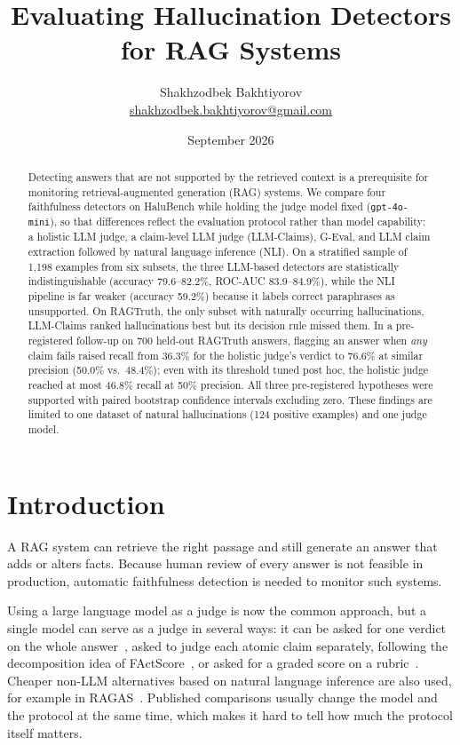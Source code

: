 \documentclass[11pt,a4paper]{article}
\title{\textbf{Evaluating Hallucination Detectors for RAG Systems}}
\author{Shakhzodbek Bakhtiyorov\\\small\href{mailto:shakhzodbek.bakhtiyorov@gmail.com}{shakhzodbek.bakhtiyorov@gmail.com}}
\date{September 2026}
\newcommand{\code}[1]{\texttt{\small #1}}
\begin{document}
\maketitle

\begin{abstract}
\noindent
Detecting answers that are not supported by the retrieved context is a prerequisite
for monitoring retrieval-augmented generation (RAG) systems. We compare four
faithfulness detectors on HaluBench while holding the judge model fixed
(\code{gpt-4o-mini}), so that differences reflect the evaluation protocol rather than
model capability: a holistic LLM judge, a claim-level LLM judge (LLM-Claims), G-Eval,
and LLM claim extraction followed by natural language inference (NLI). On a stratified
sample of 1{,}198 examples from six subsets, the three
LLM-based detectors are statistically indistinguishable (accuracy 79.6--82.2\%,
ROC-AUC 83.9--84.9\%), while the NLI pipeline is far weaker (accuracy 59.2\%) because
it labels correct paraphrases as unsupported. On RAGTruth, the only subset with
naturally occurring hallucinations, LLM-Claims ranked hallucinations best but its
decision rule missed them. In a pre-registered follow-up on 700 held-out RAGTruth
answers, flagging an answer when \emph{any} claim fails raised recall from 36.3\% for
the holistic judge's verdict to 76.6\% at similar precision (50.0\% vs.\ 48.4\%); even
with its threshold tuned post hoc, the holistic judge reached at most 46.8\% recall at
50\% precision. All three pre-registered hypotheses were supported with paired bootstrap
confidence intervals excluding zero. These findings are limited to one dataset of
natural hallucinations (124 positive examples) and one judge model.
\end{abstract}

\section{Introduction}

A RAG system can retrieve the right passage and still generate an answer that adds or
alters facts. Because human review of every answer is not feasible in production,
automatic faithfulness detection is needed to monitor such systems.

Using a large language model as a judge is now the common approach, but a single model
can serve as a judge in several ways: it can be asked for one verdict on the whole
answer~\citep{ravi2024lynx}, asked to judge each atomic claim separately, following the
decomposition idea of FActScore~\citep{min2023factscore}, or asked for a graded score
on a rubric~\citep{liu2023geval}. Cheaper non-LLM alternatives based on natural
language inference are also used, for example in RAGAS~\citep{es2024ragas}. Published
comparisons usually change the model and the protocol at the same time, which makes it
hard to tell how much the protocol itself matters.
\end{document}

